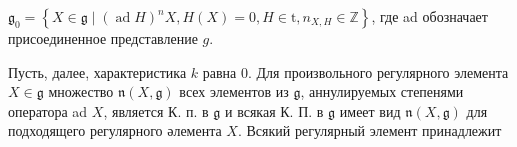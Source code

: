 \documentclass[10pt]{article}
\begin{document}
$\mathfrak{g}_{0}=\left\{X \in \mathfrak{g} \mid(\operatorname{ad} H)^{n} X, H(X)=0, H \in \mathrm{t}, n_{X, H} \in \mathbb{Z}\right\}$, где ad обозначает присоединенное представление $g$.



Пусть, далее, характеристика $k$ равна 0. Для произвольного регулярного элемента $X \in \mathfrak{g}$ множество $\mathfrak{n}(X, \mathfrak{g})$ всех элементов из $\mathfrak{g}$, аннулируемых степенями оператора ad $X$, является К. п. в $\mathfrak{g}$ и всякая К. П. в $\mathfrak{g}$ имеет вид $\mathfrak{n}(X, \mathfrak{g})$ для подходящего регулярного әлемента $X$. Всякий регулярный элемент принадлежит
\end{document}
